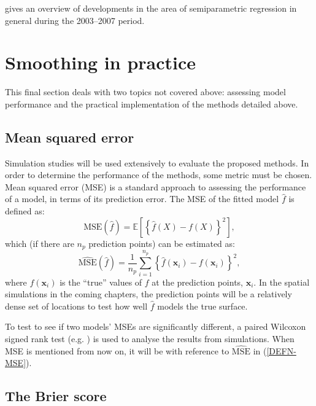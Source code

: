\cite{ruppertreview} gives an overview of developments in the area of semiparametric regression in general during the 2003--2007 period.

\section{Smoothing in practice}
\label{intro-inpractice}

This final section deals with two topics not covered above: assessing model performance and the practical implementation of the methods detailed above.

\subsection{Mean squared error}
\label{intro-MSE}

Simulation studies will be used extensively to evaluate the proposed methods. In order to determine the performance of the methods, some metric must be chosen. Mean squared error (MSE) is a standard approach to assessing the performance of a model, in terms of its prediction error. The MSE of the fitted model $\hat{f}$ is defined as:
\begin{equation*}
\text{MSE}(\hat{f}) = \mathbb{E}\left [\left \{ \hat{f}(X) - f(X) \right \}^2 \right ],
\end{equation*}
which (if there are $n_p$ prediction points) can be estimated as:
\begin{equation}
\widehat{\text{MSE}}(\hat{f}) = \frac{1}{n_p} \sum_{i=1}^{n_p} \left \{\hat{f}(\mathbf{x}_i) - f(\mathbf{x}_i) \right \}^2,
\label{DEFN-MSE}
\end{equation}
where $f(\mathbf{x}_i)$ is the ``true'' values of $f$ at the prediction points, $\mathbf{x}_i$. In the spatial simulations in the coming chapters, the prediction points will be a relatively dense set of locations to test how well $\hat{f}$ models the true surface. 

To test to see if two models' MSEs are significantly different, a paired Wilcoxon signed rank test (e.g. \cite[pp.173-175]{wetherill}) is used to analyse the results from simulations. When MSE is mentioned from now on, it will be with reference to $\widehat{\text{MSE}}$ in (\ref{DEFN-MSE}).

\subsection{The Brier score}
\label{DEFN-brier}

